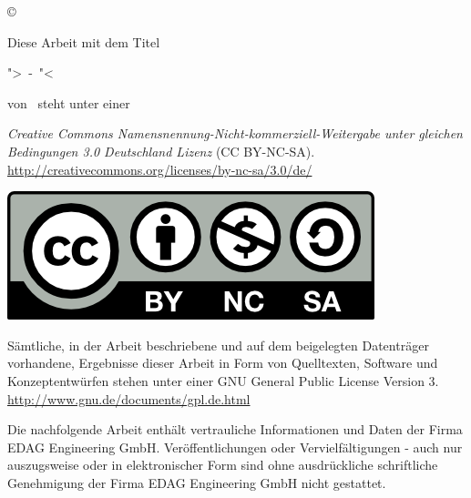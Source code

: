 \clearpage
\vspace*{\fill}



\begin{center}
	\copyright\ \jahr\ \autor \\
	
	\vspace*{15mm}
	
	Diese Arbeit mit dem Titel 
	
	">\titel\ -\ \untertitel"< 
	
	von \autor\ steht unter einer
	
	\textit{Creative Commons Namensnennung-Nicht-kommerziell-Weitergabe unter gleichen Bedingungen 3.0 Deutschland Lizenz} (CC BY-NC-SA). \linebreak
	\url{http://creativecommons.org/licenses/by-nc-sa/3.0/de/}
	
	\includegraphics[scale=0.9]{images/CC_BY-NC-SA}
	
	\vspace*{15mm}
	
	Sämtliche, in der Arbeit beschriebene und auf dem beigelegten Datenträger vorhandene, Ergebnisse dieser Arbeit in Form von Quelltexten, Software und Konzeptentwürfen stehen unter einer GNU General Public License Version 3.\linebreak
	\url{http://www.gnu.de/documents/gpl.de.html}
	
	\vspace*{15mm}
	Die nachfolgende Arbeit enthält vertrauliche Informationen und Daten der Firma
EDAG Engineering GmbH.
	Veröffentlichungen oder Vervielfältigungen - auch nur auszugsweise oder in elektronischer
Form sind ohne ausdrückliche schriftliche Genehmigung der Firma EDAG Engineering GmbH
	nicht gestattet.

\end{center}


\vspace*{\fill}
\clearpage